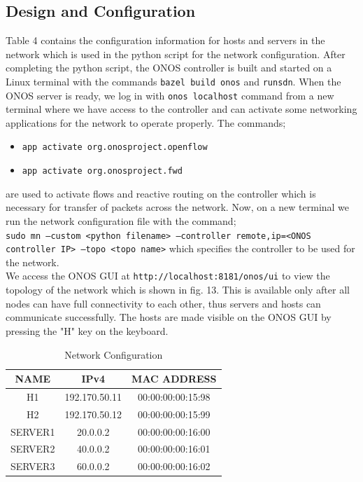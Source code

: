 \documentclass{article}
\begin{document}
\subsection{Design and Configuration}
Table 4 contains the configuration information for hosts and servers in the network which is used in the python script for the network configuration. After completing the python script, the ONOS controller is built and started on a Linux terminal with the commands \texttt{bazel build onos} and \texttt{runsdn}. When the ONOS server is ready, we log in with \texttt{onos localhost} command from a new terminal where we have access to the controller and can activate some networking applications for the network to operate properly. The commands;
	\begin{itemize}
		\centering
		\item \texttt{app activate org.onosproject.openflow}
		\item \texttt{app activate org.onosproject.fwd}
	\end{itemize}
are used to activate flows and reactive routing on the controller which is necessary for transfer of packets across the network. Now, on a new terminal we run the network configuration file with the command; \\ \texttt{sudo mn --custom <python filename> --controller remote,ip=<ONOS controller IP> --topo <topo name>} which specifies the controller to be used for the network. \\ We access the ONOS GUI at \texttt{http://localhost:8181/onos/ui} to view the topology of the network which is shown in fig. 13. This is available only after all nodes can have full connectivity to each other, thus servers and hosts can communicate successfully. The hosts are made visible on the ONOS GUI by pressing the "H" key on the keyboard.
    	\begin{table}[h]
        		\centering
        		\begin{tabular}{|c|c|c|}
            		\hline
            		NAME & IPv4 & MAC ADDRESS \\
            		\hline
            		H1 & 192.170.50.11 & 00:00:00:00:15:98 \\
           		H2 & 192.170.50.12 & 00:00:00:00:15:99 \\
            		SERVER1 & 20.0.0.2 & 00:00:00:00:16:00 \\
            		SERVER2 & 40.0.0.2 & 00:00:00:00:16:01 \\
            		SERVER3 & 60.0.0.2 & 00:00:00:00:16:02 \\
            		\hline
        		\end{tabular}
        		\caption{Network Configuration}
        		\label{tab:4}
    	\end{table}
\end{document}
